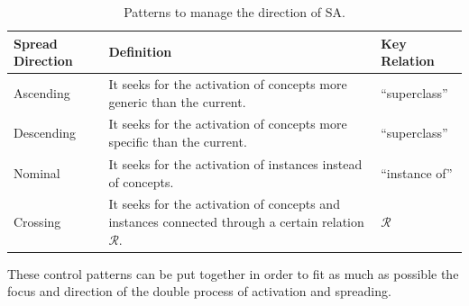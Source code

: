 \begin{table}[htb]

    \begin{tabular}{|p{3cm}|p{6cm}|p{3cm}|}
     \hline
      \textbf{Spread Direction} & \textbf{Definition} & \textbf{Key Relation} \\
        
	\hline
  	 Ascending& It seeks for the activation of concepts more generic than
the current. & ``superclass''\\
	\hline
  	 Descending& It seeks for the activation of concepts more specific than
the current. & ``superclass''\\
	\hline
  	 Nominal& It seeks for the activation of instances instead of concepts. &
``instance of'' \\
	\hline
  	 Crossing&  It seeks for the activation of concepts and instances connected
through a certain relation $\mathcal{R}$.  & $\mathcal{R}$ \\
     \hline

    \hline	
    \end{tabular}
    \caption{Patterns to manage the direction of SA.}
\label{guidingspreading}
\end{table} 

These control patterns can be put together in order to fit as much as possible the focus
and direction of the double process of activation and spreading.


